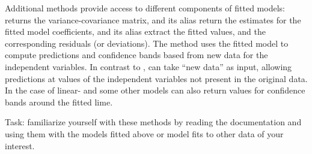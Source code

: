 \documentclass[krantz2]{krantz}\usepackage{knitr}%
\begin{document}
Additional methods provide access to different components of fitted models:  returns the variance-covariance matrix,  and its alias  return the estimates for the fitted model coefficients,  and its alias  extract the fitted values, and  the corresponding residuals (or deviations). The method  uses the fitted model to compute predictions and confidence bands based from new data for the independent variables. In contrast to ,  can take ``new data'' as input, allowing predictions at values of the independent variables not present in the original data. In the case of linear- and some other models  can also return values for confidence bands around the fitted lime.

\begin{advplayground}
Task: familiarize yourself with these methods by reading the documentation and using them with the models fitted above or model fits to other data of your interest.
\end{advplayground}
\end{document}
